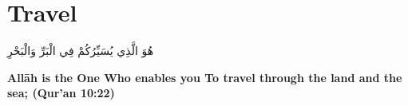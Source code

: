 \chapter{Travel}
\begin{center}
    {\Huge    
        \begin{Arabic}
            هُوَ الَّذِي يُسَيِّرُكُمْ فِي الْبَرِّ وَالْبَحْرِ
        \end{Arabic}
    }    
\end{center}
\vspace*{\fill}
\vspace{3cm}
\begin{center}
    \large \textbf{Allāh is the One Who enables you To travel through the land and the sea; (Qur'an 10:22)}
\end{center}
